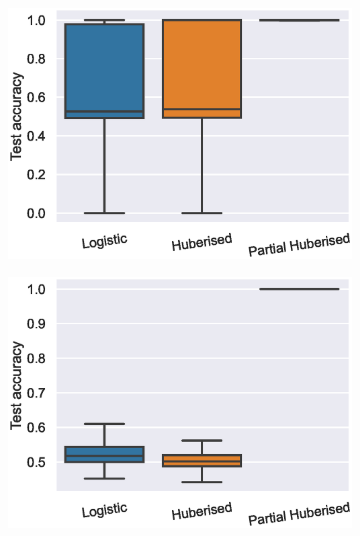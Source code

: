 \begin{figure}[htp]
\centering
  \begin{subfigure}{0.31\linewidth}
      \includegraphics[width=\columnwidth]{figs/long_servedio_0.45.eps}
    \label{fig:long&servedio-0.45}
  \end{subfigure}
  \begin{subfigure}{0.31\linewidth}
    \includegraphics[width=\columnwidth]{figs/long_servedio_0.2.eps}
    \label{fig:long&servedio-0.2}
  \end{subfigure}
  \begin{subfigure}{0.31\linewidth}

\end{subfigure}
\end{figure}
